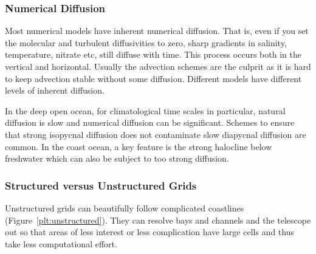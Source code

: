 \documentclass[letterpaper,12pt]{article}
\begin{document}
\subsubsection*{Numerical Diffusion}

Most numerical models have inherent numerical diffusion.  That is,
even if you set the molecular and turbulent diffusivities to zero,
sharp gradients in salinity, temperature, nitrate etc, still diffuse with time.  This process occurs both in the vertical and horizontal.  Usually the advection schemes are the culprit as it is hard to keep advection stable without some diffusion.  Different models have different levels of inherent diffusion.

In the deep open ocean, for climatological time scales in particular, natural diffusion is slow and numerical diffusion can be significant.  Schemes to ensure that strong isopycnal diffusion does not contaminate slow diapycnal diffusion are common.  In the coast ocean, a key feature is the strong halocline below freshwater which can also be subject to too strong diffusion.

\subsubsection*{Structured versus Unstructured Grids}

Unstructured grids can beautifully follow complicated coastlines (Figure~\ref{plt:unstructured}).  They can resolve bays and channels and the telescope out so that areas of less interest or less complication have large cells and thus take less computational effort.
\end{document}
